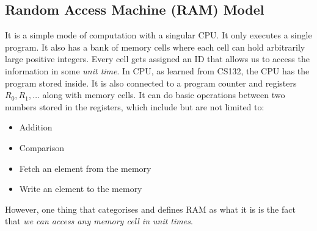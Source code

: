 \documentclass[a4paper]{article}
\theoremstyle{plain}
\theoremstyle{definition}
\theoremstyle{remark}
\begin{document}
\subsection{Random Access Machine (RAM) Model}
It is a simple mode of computation with a singular CPU. It only executes a single program. It also has a bank of memory cells where each cell can hold arbitrarily large positive integers. Every cell gets assigned an ID that allows us to access the information in some \textit{unit time}. In CPU, as learned from CS132, the CPU has the program stored inside. It is also connected to a program counter and registers $R_0,R_1,\ldots$ along with memory cells. It can do basic operations between two numbers stored in the registers, which include but are not limited to:
\begin{itemize}
	\item Addition
	\item Comparison
	\item Fetch an element from the memory
	\item Write an element to the memory
\end{itemize}
However, one thing that categorises and defines RAM as what it is is the fact that \textit{we can access any memory cell in unit times}. 
\end{document}
